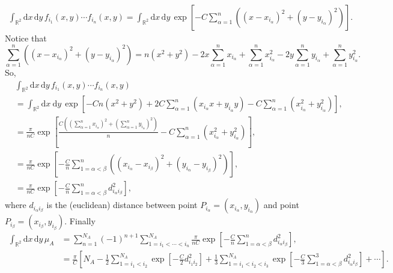 \documentclass[12pt]{article}
\newcommand{\xd}{\mathrm{d}}
\numberwithin{equation}{section} %
\numberwithin{figure}{section} %
\theoremstyle{definition}
\begin{document}
\begin{align}
\int_{{\mathbb R}^2} \xd x \, \xd y \,  f_{i_1} (x,y)\cdots f_{i_n} (x,y) = \int_{{\mathbb R}^2} \xd x \, \xd y \,  \exp \left[ -C \sum_{\alpha=1}^n \left( (x-x_{i_{\alpha}})^2 + (y-y_{i_{\alpha}})^2 \right) \right].
\end{align}
Notice that 
\begin{equation}
\sum_{\alpha=1}^n  \left( (x-x_{i_{\alpha}})^2 +(y-y_{i_{\alpha}})^2 \right) = n (x^2+y^2) -2x  \sum_{\alpha=1}^n x_{i_{\alpha}} + \sum_{\alpha=1}^n x_{i_{\alpha}}^2 -2y \sum_{\alpha=1}^n y_{i_{\alpha}} + \sum_{\alpha=1}^n y_{i_{\alpha}}^2.
\end{equation}
So, 
\begin{align}
&\int_{{\mathbb R}^2} \xd x \, \xd y \,  f_{i_1} (x,y)\cdots f_{i_n} (x,y) \nonumber\\
&= \int_{{\mathbb R}^2} \xd x  \ \xd y \, \exp \left[ -Cn(x^2+y^2) +2C \sum_{\alpha=1}^n \left( x_{i_{\alpha}} x +y_{i_{\alpha}} y \right) - C \sum_{\alpha=1}^n \left(x_{i_{\alpha}}^2 + y_{i_{\alpha}}^2 \right) \right], \nonumber\\
&= \frac{\pi}{nC} \exp \left[ \frac{C(\left( \sum_{\alpha=1}^n x_{i_{\alpha}}\right)^2+\left( \sum_{\alpha=1}^n y_{i_{\alpha}}\right)^2)}{n}  - C \sum_{\alpha=1}^n (x_{i_{\alpha}}^2+y_{i_{\alpha}}^2)\right], \nonumber\\
&=  \frac{\pi}{nC} \exp \left[ - \frac{C}{n} \sum_{1=\alpha<\beta}^n \left((x_{i_\alpha}-x_{i_\beta})^2 + (y_{i_{\alpha}}-y_{i_{\beta}})^2 \right) \right], \nonumber\\
&=  \frac{\pi}{nC} \exp \left[ - \frac{C}{n} \sum_{1=\alpha < \beta}^n d_{i_{\alpha} i_{\beta}}^2 \right],
\end{align}
where $d_{i_{\alpha} i_{\beta}}$ is the (euclidean) distance between point $P_{i_{\alpha}} =(x_{i_{\alpha}} ,y_{i_{\alpha}} )$ and point $P_{i_{\beta}}=(x_{i_{\beta}},y_{i_{\beta}})$. Finally
\begin{align}
\int_{{\mathbb R}^2} \xd x \, \xd y \, \mu_A&= \sum_{n=1}^{N_A} (-1)^{n+1} \sum_{ 1=i_1< \cdots <i_n }^{N_A} \frac{\pi}{nC} \exp \left[ - \frac{C}{n} \sum_{1=\alpha < \beta}^n d_{i_{\alpha} i_{\beta}}^2 \right], \\
&= \frac{\pi}{C} \left[ N_A - \frac12  \sum_{ 1=i_1< i_2}^{N_A} \exp \left[- \frac{C}{2}  d_{i_{1} i_{2}}^2 \right] + \frac{1}{3}  \sum_{ 1=i_1< i_2 <i_3 }^{N_A}  \exp \left[ - \frac{C}{3} \sum_{1=\alpha < \beta}^3 d_{i_{\alpha} i_{\beta}}^2 \right] + \cdots
\right].
\end{align}
\end{document}
